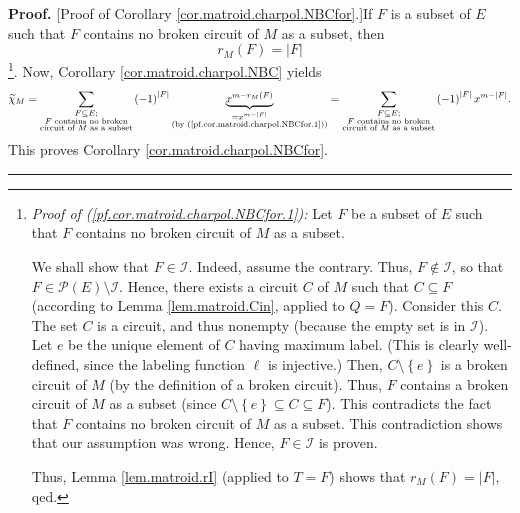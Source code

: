 \documentclass[numbers=enddot,12pt,final,onecolumn,notitlepage]{scrartcl}%
\theoremstyle{definition}
\newenvironment{proof}[1][Proof]{\noindent\textbf{#1.} }{\ \rule{0.5em}{0.5em}}
\let\sumnonlimits\sum
\renewcommand{\sum}{\sumnonlimits\limits}
\begin{document}
\begin{proof}
[Proof of Corollary \ref{cor.matroid.charpol.NBCfor}.]If $F$ is a subset of
$E$ such that $F$ contains no broken circuit of $M$ as a subset, then%
\begin{equation}
r_{M}\left(  F\right)  =\left\vert F\right\vert
\label{pf.cor.matroid.charpol.NBCfor.1}%
\end{equation}
\footnote{\textit{Proof of (\ref{pf.cor.matroid.charpol.NBCfor.1}):} Let $F$
be a subset of $E$ such that $F$ contains no broken circuit of $M$ as a
subset.
\par
We shall show that $F\in\mathcal{I}$. Indeed, assume the contrary. Thus,
$F\notin\mathcal{I}$, so that $F\in\mathcal{P}\left(  E\right)  \setminus
\mathcal{I}$. Hence, there exists a circuit $C$ of $M$ such that $C\subseteq
F$ (according to Lemma \ref{lem.matroid.Cin}, applied to $Q=F$). Consider this
$C$. The set $C$ is a circuit, and thus nonempty (because the empty set is in
$\mathcal{I}$). Let $e$ be the unique element of $C$ having maximum label.
(This is clearly well-defined, since the labeling function $\ell$ is
injective.) Then, $C\setminus\left\{  e\right\}  $ is a broken circuit of $M$
(by the definition of a broken circuit). Thus, $F$ contains a broken circuit
of $M$ as a subset (since $C\setminus\left\{  e\right\}  \subseteq C\subseteq
F$). This contradicts the fact that $F$ contains no broken circuit of $M$ as a
subset. This contradiction shows that our assumption was wrong. Hence,
$F\in\mathcal{I}$ is proven.
\par
Thus, Lemma \ref{lem.matroid.rI} (applied to $T=F$) shows that $r_{M}\left(
F\right)  =\left\vert F\right\vert $, qed.}. Now, Corollary
\ref{cor.matroid.charpol.NBC} yields%
\[
\widetilde{\chi}_{M}=\sum_{\substack{F\subseteq E;\\F\text{ contains no
broken}\\\text{circuit of }M\text{ as a subset}}}\left(  -1\right)
^{\left\vert F\right\vert }\underbrace{x^{m-r_{M}\left(  F\right)  }%
}_{\substack{=x^{m-\left\vert F\right\vert }\\\text{(by
(\ref{pf.cor.matroid.charpol.NBCfor.1}))}}}=\sum_{\substack{F\subseteq
E;\\F\text{ contains no broken}\\\text{circuit of }M\text{ as a subset}%
}}\left(  -1\right)  ^{\left\vert F\right\vert }x^{m-\left\vert F\right\vert
}.
\]
This proves Corollary \ref{cor.matroid.charpol.NBCfor}.
\end{proof}
\end{document}
